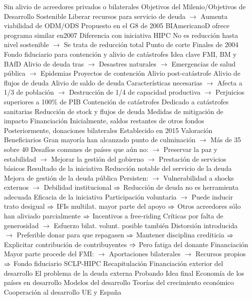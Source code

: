 \documentclass{nuevotema}
\begin{document}
\begin{esquemal}
				\4[] Sin alivio de acreedores privados o bilaterales
				\4 Objetivos del Milenio/Objetivos de Desarrollo Sostenible
				\4[] Liberar recursos para servicio de deuda
				\4[] $\to$ Aumenta viabilidad de ODM/ODS
				\4 Propuesto en el G8 de 2005
				\4[] BIAmericanoD ofrece programa similar en2007
				\4 Diferencia con iniciativa HIPC
				\4[] No es reducción hasta nivel sostenible
				\4[] $\to$ Se trata de reducción total
				\4 Punto de corte
				\4[] Finales de 2004
			\3 Fondo fiduciario para contención y alivio de catástrofes
				\4 Idea clave
				\4[] FMI, BM y BAfD
				\4[] Alivio de deuda tras
				\4[] $\to$ Desastres naturales
				\4[] $\to$ Emergencias de salud pública
				\4[] $\to$ Epidemias
				\4[] Proyectos de contención
				\4 Alivio post-catástrofe
				\4[] Alivio de flujos de deuda
				\4[] Alivio de saldo de deuda
				\4[] Características necesarias
				\4[] $\to$ Afecta a 1/3 de población
				\4[] $\to$ Destrucción de 1/4 de capacidad productiva
				\4[] $\to$ Perjuicios superiores a 100\% de PIB
				\4 Contención de catástrofes
				\4[] Dedicado a catástrofes sanitarias
				\4[] Reducción de stock y flujos de deuda
				\4[] Medidas de mitigación de impacto
				\4 Financiación
				\4[] Inicialmente, saldos restantes de otros fondos
				\4[] Posteriormente, donaciones bilaterales
				\4 Establecido en 2015
			\3 Valoración
				\4 Beneficiarios
				\4[] Gran mayoría han alcanzado punto de culminación
				\4[] $\to$ Más de 35 sobre 40
				\4[] Desafíos comunes de países que aún no:
				\4[] $\to$ Preservar la paz y estabilidad
				\4[] $\to$ Mejorar la gestión del gobierno
				\4[] $\to$ Prestación de servicios básicos
				\4 Resultado de la iniciativa
				\4[] Reducción notable del servicio de la deuda
				\4[] Mejora de gestión de la deuda pública
				\4[] Persisten:
				\4[] $\to$ Vulnerabilidad a shocks externos
				\4[] $\to$ Debilidad institucional
				\4[] $\Rightarrow$ Reducción de deuda no es herramienta adecuada
				\4 Eficacia de la iniciativa
				\4[] Participación voluntaria
				\4[] $\to$ Puede inducir trato desigual
				\4[] $\Rightarrow$ IFIs multilat. mayor parte del apoyo
				\4[] $\Rightarrow$ Otros acreedores sólo han aliviado parcialmente
				\4[] $\Rightarrow$ Incentivos a free-riding
				\4[] Críticas por falta de generosidad
				\4[] $\to$ Esfuerzo bilat. volunt. posible también
				\4[] Distorsión introducida
				\4[] $\to$ Preferible donar para que repagasen
				\4[] $\Rightarrow$ Mantener disciplina crediticia
				\4[] $\Rightarrow$ Explicitar contribución de contribuyentes
				\4[] $\Rightarrow$ Pero fatiga del donante
				\4 Financiación
				\4[] Mayor parte procede del FMI:
				\4[] $\to$ Aportaciones bilaterales
				\4[] $\to$ Recursos propios
				\4[] $\Rightarrow$ Fondo fiduciario SCLP-HIPC
	\1[] 
		\2 Recapitulación
			\3 Financiación exterior del desarrollo
			\3 El problema de la deuda externa
			\3 Probando
		\2 Idea final
			\3 Economía de los países en desarrollo
			\3 Modelos del desarrollo
			\3 Teorías del crecimiento económico
			\3 Cooperación al desarrollo UE y España
\end{esquemal}
\end{document}

